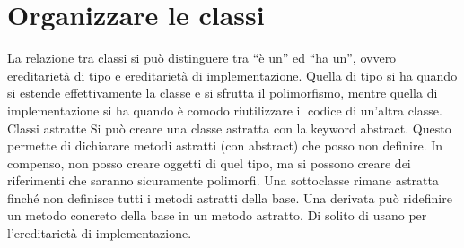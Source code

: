 \chapter{Organizzare le classi}

La relazione tra classi si può distinguere tra “è un” ed “ha un”, ovvero ereditarietà di tipo e ereditarietà di implementazione. Quella di tipo si ha quando si estende effettivamente la classe e si sfrutta il polimorfismo, mentre quella di implementazione si ha quando è comodo riutilizzare il codice di un'altra classe.
Classi astratte
Si può creare una classe astratta con la keyword abstract. Questo permette di dichiarare metodi astratti (con abstract) che posso non definire. In compenso, non posso creare oggetti di quel tipo, ma si possono creare dei riferimenti che saranno sicuramente polimorfi. Una sottoclasse rimane astratta finché non definisce tutti i metodi astratti della base.
Una derivata può ridefinire un metodo concreto della base in un metodo astratto.
Di solito di usano per l'ereditarietà di implementazione.

